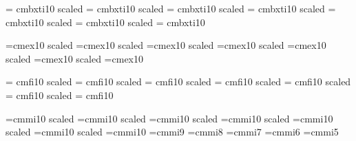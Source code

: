 \font \twentyfourbxti = cmbxti10 scaled 
\font \twentybxti = cmbxti10 scaled 
\font \seventeenbxti = cmbxti10 scaled 
\font \fourteenbxti = cmbxti10 scaled 
\font \twelvebxti = cmbxti10 scaled 
\font \elevenbxti = cmbxti10 scaled \magstephalf
\font \tenbxti = cmbxti10


\font \twentyfourex=cmex10 scaled 
\font \twentyex=cmex10 scaled 
\font \seventeenex=cmex10 scaled 
\font \fourteenex=cmex10 scaled 
\font \twelveex=cmex10 scaled 
\font \elevenex=cmex10 scaled \magstephalf
\font \tenex=cmex10

\font \twentyfourfi = cmfi10 scaled 
\font \twentyfi = cmfi10 scaled 
\font \seventeenfi = cmfi10 scaled 
\font \fourteenfi = cmfi10 scaled 
\font \twelvefi = cmfi10 scaled 
\font \elevenfi = cmfi10 scaled \magstephalf
\font \tenfi = cmfi10


\font \twentyfouri=cmmi10 scaled 
\font \twentyi=cmmi10 scaled 
\font \seventeeni=cmmi10 scaled 
\font \fourteeni=cmmi10 scaled 
\font \twelvei=cmmi10 scaled 
\font \eleveni=cmmi10 scaled \magstephalf
\font \teni=cmmi10
\font \ninei=cmmi9
\font \eighti=cmmi8
\font \seveni=cmmi7
\font \sixi=cmmi6
\font \fivei=cmmi5


